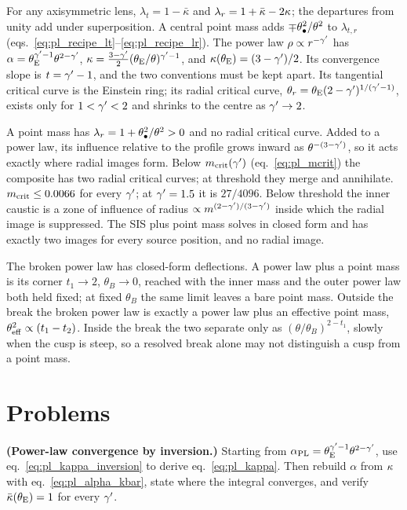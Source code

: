 For any axisymmetric lens, $\lambda_t=1-\bar\kappa$ and
$\lambda_r=1+\bar\kappa-2\kappa$; the departures from unity
add under superposition.  A central point mass adds
$\mp\theta_{\bullet}^2/\theta^2$ to $\lambda_{t,r}$
(eqs.~\ref{eq:pl_recipe_lt}--\ref{eq:pl_recipe_lr}).
The power law $\rho\propto r^{-\gamma'}$ has
$\alpha=\theta_{\mathrm{E}}^{\gamma'-1}\theta^{2-\gamma'}$,
$\kappa=\tfrac{3-\gamma'}{2}(\theta_{\mathrm{E}}/\theta)^{\gamma'-1}$, and
$\kappa(\theta_{\mathrm{E}})=(3-\gamma')/2$.  Its convergence slope is
$t=\gamma'-1$, and the two conventions must be kept apart.
Its tangential critical curve is the Einstein ring; its
radial critical curve,
$\theta_r=\theta_{\mathrm{E}}(2-\gamma')^{1/(\gamma'-1)}$, exists only for
$1<\gamma'<2$ and shrinks to the centre as $\gamma'\to2$.

A point mass has $\lambda_r=1+\theta_{\bullet}^2/\theta^2>0$ and no
radial critical curve.  Added to a power law, its influence
relative to the profile grows inward as $\theta^{-(3-\gamma')}$,
so it acts exactly where radial images form.
Below $m_{\rm crit}(\gamma')$ (eq.~\ref{eq:pl_mcrit}) the
composite has two radial critical curves; at threshold they
merge and annihilate.  $m_{\rm crit}\le0.0066$ for every
$\gamma'$; at $\gamma'=1.5$ it is $27/4096$.  Below threshold the
inner caustic is a zone of influence of radius
$\propto m^{(2-\gamma')/(3-\gamma')}$ inside which the radial image
is suppressed.
The SIS plus point mass solves in closed form and has exactly
two images for every source position, and no radial image.

The broken power law has closed-form deflections.  A power
law plus a point mass is its corner $t_1\to2$, $\theta_B\to0$,
reached with the inner mass and the outer power law both held
fixed; at fixed $\theta_B$ the same limit leaves a bare point
mass.  Outside the break the broken power law is
exactly a power law plus an effective point mass,
$\theta_{\rm eff}^2\propto(t_1-t_2)$.  Inside the break the two
separate only as $(\theta/\theta_B)^{2-t_1}$, slowly when the
cusp is steep, so a resolved break alone may not distinguish a cusp
from a point mass.


\section{Problems}
\label{sec:pl_problems}

\begin{exercise}
\label{ex:pl_kappa_inversion}
\textbf{(Power-law convergence by inversion.)}
Starting from $\alpha_{\rm PL}=\theta_{\mathrm{E}}^{\gamma'-1}\theta^{2-\gamma'}$, use
eq.~\eqref{eq:pl_kappa_inversion} to derive
eq.~\eqref{eq:pl_kappa}.  Then rebuild $\alpha$ from $\kappa$ with
eq.~\eqref{eq:pl_alpha_kbar}, state where the integral converges, and
verify $\bar\kappa(\theta_{\mathrm{E}})=1$ for every $\gamma'$.
\end{exercise}

